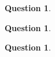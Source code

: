 \documentclass[11pt]{amsart}
\newtheorem{qns}[theorem]{Question}
\begin{document}
\begin{qns}

\end{qns}
\begin{qns}

\end{qns}
\begin{qns}

\end{qns}
\end{document}
